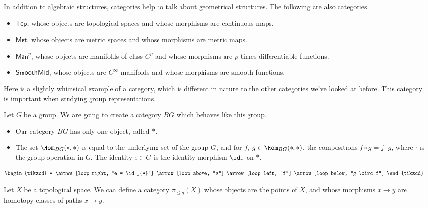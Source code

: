 \documentclass[main.tex]{subfiles}
\begin{document}
\begin{example}
  \label{eg:moreexamplesofcategories}
  In addition to algebraic structures, categories help to talk about geometrical structures. The following are also categories.
  \begin{itemize}
    \item $\mathsf{Top}$, whose objects are topological spaces and whose morphisms are continuous maps.
    \item $\mathsf{Met}$, whose objects are metric spaces and whose morphisms are metric maps.
    \item $\mathsf{Man}^{p}$, whose objects are manifolds of class $C^{p}$ and whose morphisms are $p$-times differentiable functions.

    \item $\mathsf{SmoothMfd}$, whose objects are $C^{\infty}$ manifolds and whose morphisms are smooth functions.
  \end{itemize}
\end{example}

\begin{example}
  \label{eg:groupsaregroupoidswithoneobject}
  Here is a slightly whimsical example of a category, which is different in nature to the other categories we've looked at before. This category is important when studying group representations.

  Let $G$ be a group. We are going to create a category $BG$ which behaves like this group.
  \begin{itemize}
    \item Our category $BG$ has only one object, called $*$.

    \item The set $\Hom_{BG}(*, *)$ is equal to the underlying set of the group $G$, and for $f$, $g \in \Hom_{BG}(*, *)$, the compositions $f \circ g = f\cdot g$, where $\cdot$ is the group operation in $G$. The identity $e \in G$ is the identity morphism $\id_{*}$ on $*$.
  \end{itemize}
  \begin{equation*}
    \begin{tikzcd}
      *
      \arrow[loop right, "e = \id_{*}"]
      \arrow[loop above, "g"]
      \arrow[loop left, "f"]
      \arrow[loop below, "g \circ f"]
    \end{tikzcd}
  \end{equation*}
\end{example}

\begin{example}
  Let $X$ be a topological space. We can define a category $\pi_{\leq q}(X)$ whose objects are the points of $X$, and whose morphisms $x \to y$ are homotopy classes of paths $x \to y$.
\end{example}
\end{document}
